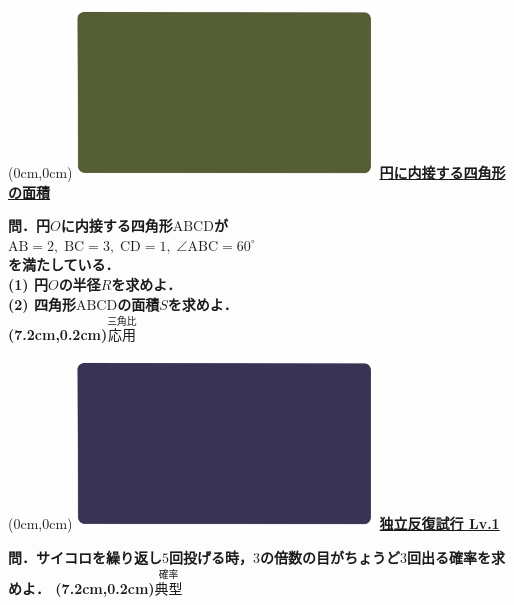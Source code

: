 \documentclass[10pt,
fleqn,
dvipdfmx,
uplatex
]{jsarticle}
\begin{document}
\newpage

\at(0cm,0cm){\includegraphics[width=8cm,bb=0 0 1920 1080]{./youtube/thumbnails/templates/smart_background/三角比.jpeg}}
{\color{orange}\bf\boldmath\Large\underline{円に内接する四角形の面積}}\vspace{0.3zw}

\normalsize 
\bf\boldmath 問．円$O$に内接する四角形$\text{ABCD}$が\\
\hspace{0.3zw}$\text{AB}=2,\;\text{BC}=3,\;\text{CD}=1,\;\angle \text{ABC}={60}^\circ$\\
を満たしている．\\
\large
(1)  円$O$の半径$R$を求めよ．\\
(2)  四角形$\text{ABCD}$の面積$S$を求めよ．\\

\at(7.2cm,0.2cm){\small\color{bradorange}$\overset{\text{三角比}}{\text{応用}}$}



\newpage



\at(0cm,0cm){\includegraphics[width=8cm,bb=0 0 1920 1080]{./youtube/thumbnails/templates/smart_background/確率.jpeg}}
{\color{orange}\bf\boldmath\LARGE\underline{独立反復試行 Lv.1 }}\vspace{0.3zw}

\LARGE 
\bf\boldmath 問．サイコロを繰り返し$5$回投げる時，$3$の倍数の目がちょうど$3$回出る確率を求めよ．
\at(7.2cm,0.2cm){\small\color{bradorange}$\overset{\text{確率}}{\text{典型}}$}


\newpage
\end{document}
